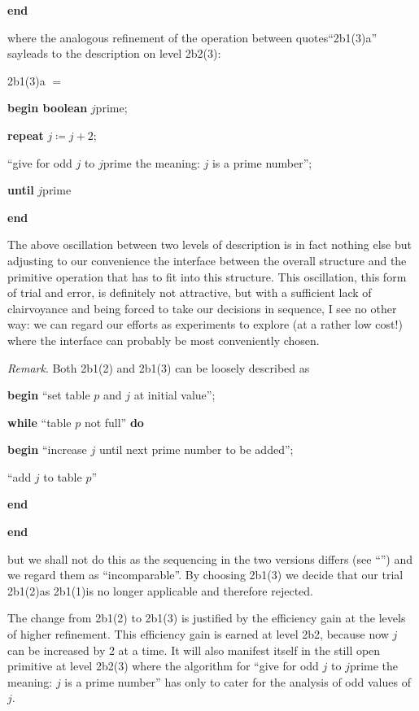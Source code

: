 \documentclass[twoside,11pt]{book}
\begin{document}
\noindent
\textbf{end}

\noindent
where the analogous refinement of the operation between quotes\textemdash{}``2b1(3)a'' say\textemdash{}leads to the description on level 2b2(3):

\noindent
2b1(3)a $=$

\noindent
\textbf{begin boolean} $j$prime;

\noindent
\quad\textbf{repeat} $j \coloneq j + 2;$

\noindent
\quad\quad``give for odd $j$ to $j$prime the meaning: $j$ is a prime number'';

\noindent
\quad\textbf{until} $j$prime

\noindent
\textbf{end}

The above oscillation between two levels of description is in fact nothing else but adjusting to our convenience the interface between the overall structure and the primitive operation that has to fit into this structure. This oscillation, this form of trial and error, is definitely not attractive, but with a sufficient lack of clairvoyance and being forced to take our decisions in
sequence, I see no other way: we can regard our efforts as experiments to explore (at a rather low cost!) where the interface can probably be most conveniently chosen.

\noindent
\textit{Remark}. Both 2b1(2) and 2b1(3) can be loosely described as

\noindent
\textbf{begin} ``set table $p$ and $j$ at initial value'';

\noindent
\quad\textbf{while} ``table $p$ not full'' \textbf{do}

\noindent
\quad\textbf{begin} ``increase $j$ until next prime number to be added'';

\noindent
\quad\quad ``add $j$ to table $p$''

\noindent
\quad\textbf{end}

\noindent
\textbf{end}

\noindent
but we shall not do this as the sequencing in the two versions differs (see ``'') and we regard them as ``incomparable''. By choosing 2b1(3) we decide that our trial 2b1(2)\textemdash{}as 2b1(1)\textemdash{}is no longer applicable and therefore rejected.

The change from 2b1(2) to 2b1(3) is justified by the efficiency gain at the levels of higher refinement. This efficiency gain is earned at level 2b2, because now $j$ can be increased by 2 at a time. It will also manifest itself in the still open primitive at level 2b2(3) where the algorithm for ``give for odd $j$ to $j$prime the meaning: $j$ is a prime number'' has only to cater for the analysis of odd values of $j$.
\end{document}
